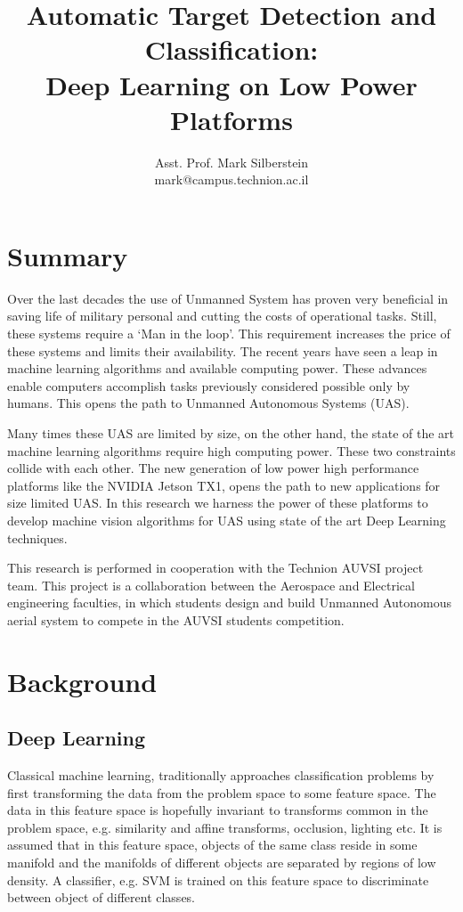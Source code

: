 \documentclass{article} %
\title{Automatic Target Detection and Classification: \\
  Deep Learning on Low Power Platforms}
\author{
  Asst. Prof. Mark Silberstein \\
  mark@campus.technion.ac.il\\
}
\begin{document}
\maketitle

\section{Summary}

Over the last decades the use of Unmanned System has proven very beneficial in
saving life of military personal and cutting the costs of operational tasks.
Still, these systems require a `Man in the loop'. This requirement increases the price
of these systems and limits their availability.
The recent years have seen a leap in machine learning algorithms and available
computing power. These advances enable computers accomplish tasks
previously considered possible only by humans.
This opens the path to Unmanned Autonomous Systems (UAS).

Many times these UAS are limited by size, on the other hand, the state of the
art machine learning algorithms require high computing power. These two
constraints collide with each other.
The new generation of low power high performance platforms like the NVIDIA
Jetson TX1, opens the path to new applications for size limited UAS.
In this research we harness the power of these platforms to develop machine vision
algorithms for UAS using state of the art Deep Learning techniques. 

This research is performed in cooperation with the Technion AUVSI project team.
This project is a collaboration between the Aerospace and Electrical engineering
faculties, in which students design and build Unmanned Autonomous aerial system
to compete in the AUVSI students competition.

\section{Background}

\subsection{Deep Learning}
\label{sec:deep_learning}

Classical machine learning, traditionally approaches classification problems
by first transforming the data from the problem space to some feature
space. The data in this feature space is hopefully invariant to transforms common
in the problem space, e.g. similarity and affine transforms, occlusion, lighting
etc. It is assumed that in this feature space, objects of the same class reside
in some manifold and the manifolds of different objects are separated by regions
of low density. A classifier, e.g. SVM is trained on this feature space to
discriminate between object of different classes.
\end{document}
